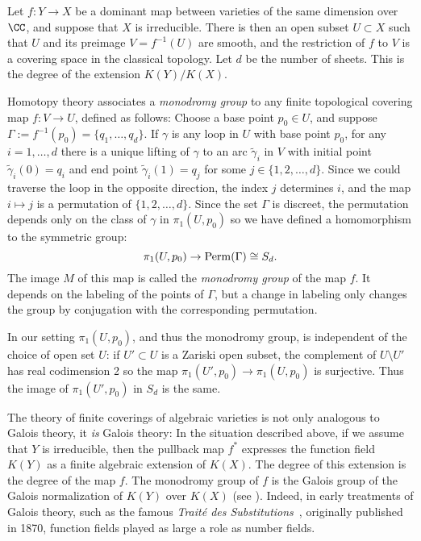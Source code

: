 Let $f : Y \to X$ be a dominant map between varieties of the same dimension over $\CC$, and suppose that $X$ is irreducible. There is then an open subset $U \subset X$ such that $U$ and 
its preimage $V = f^{-1}(U)$ are smooth, and the restriction of $f$ to $V$ is a covering space in the classical topology. Let $d$ be the number of sheets. This is the degree of the extension $K(Y)/K(X)$.

Homotopy theory  associates a \emph{monodromy group} to any finite topological covering map $f : V \to U$, defined as follows: Choose a base point $p_0 \in U$, and suppose $\Gamma := f^{-1}(p_0)  = \{q_1,\dots,q_d\}$. If $\gamma$ is any loop in $U$ with base point $p_0$, for any $i = 1, \dots, d$ there is a unique lifting of $\gamma$ to an arc $\tilde \gamma_i$ in $V$ with initial point $\tilde \gamma_i(0) = q_i$ and end point $\tilde \gamma_i(1) = q_j$ for some $j \in \{1,2,\dots,d\}$. Since we could traverse the loop in the opposite direction, the index $j$ determines $i$, and the map $i\mapsto j$ is a permutation of $\{1,2,\dots,d\}$. 
Since the set $\Gamma$ is discreet, the permutation depends only on the class of $\gamma$ in $\pi_1(U,p_0)$ so we have defined a homomorphism to the symmetric group:
$$
\pi_1(U,p_0)  \to {\rm Perm}(\Gamma) \cong S_d.
$$
The image $M$ of this map is called the \emph{monodromy group} of the map $f$. It depends on the labeling of the points of $\Gamma$, but a change in labeling
only changes the group by conjugation with the corresponding permutation. 

\begin{fact}\label{Galois equals monodromy}
In our setting $\pi_1(U,p_0)$, and thus the monodromy group, is independent of the choice of open set $U$: if $U' \subset U$ is a Zariski open subset, the complement of $U\setminus U'$ has
real codimension 2 so the map $\pi_1(U', p_0) \to \pi_1(U,p_0)$ is surjective. Thus the image of $\pi_1(U', p_0)$ in $S_d$ is the same. 

The theory of finite coverings of algebraic varieties is not only analogous to Galois theory, it \emph{is} Galois theory: In the situation described above, if we assume that $Y$ is irreducible, then the pullback map $f^*$ expresses the function field $K(Y)$ as a finite algebraic extension of $K(X)$. The degree of this extension is the degree of the map $f$. The monodromy group of $f$  is the Galois group of the Galois normalization of $K(Y)$ over $K(X)$ (see \cite{Harris1979}). Indeed, in early treatments of Galois theory, such as the famous \emph{Trait\'e des Substitutions}~\cite{MR1188877}, originally published in 1870, function fields played as large a role as number fields.
\end{fact}

